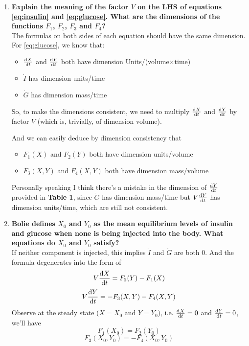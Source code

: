 \begin{homeworkProblem}
\begin{enumerate}
\item \textbf{Explain the meaning of the factor $V$ on the LHS of equations \eqref{eq:insulin} and \eqref{eq:glucose}. What are the dimensions of the functions $F_1$, $F_2$, $F_3$ and $F_4$?}\\

The formulas on both sides of each equation should have the same dimension. For \eqref{eq:glucose}, we know that:\begin{itemize}
    \item $\deriv[t]{X}$ and $\deriv[t]{Y}$ both have dimension Units/(volume$\times$time)
    \item $\dot I$ has dimension units/time
    \item $\dot G$ has dimension mass/time
\end{itemize}
So, to make the dimensions consistent, we need to multiply $\deriv[t]{X}$ and $\deriv[t]{Y}$ by factor $V$ (which is, trivially, of dimension volume).

And we can easily deduce by dimension consistency that \begin{itemize}
    \item $F_1(X)$ and $F_2(Y)$ both have dimension units/volume
    \item $F_3(X, Y)$ and $F_4(X,Y)$ both have dimension mass/volume
\end{itemize}

Personally speaking I think there's a mistake in the dimension of $\deriv[t]{Y}$ provided in \textbf{Table 1}, since $\dot G$ has dimension mass/time but $V\deriv[t]{Y}$ has dimension units/time, which are still not consistent.

\pagebreak

\item \textbf{Bolie defines $X_0$ and $Y_0$ as the mean equilibrium levels of insulin and glucose when none is being injected into the body. What equations do $X_0$ and $Y_0$ satisfy?}\\

If neither component is injected, this implies $\dot{I}$ and $\dot{G}$ are both 0. And the formula degenerates into the form of 
\begin{equation}
    V \deriv[t]{X} = F_2(Y) - F_1(X)
\end{equation}
\begin{equation}
    V \deriv[t]{Y} = - F_3(X, Y)-F_4(X,Y)
\end{equation}
Observe at the steady state ($X = X_0$ and $Y = Y_0$), i.e. $\deriv[t]{X} = 0$ and $\deriv[t]{Y} = 0$, we'll have 
\begin{equation}
    F_1(X_0) = F_2(Y_0)
\end{equation}
\begin{equation}
    F_3(X_0, Y_0) = - F_4(X_0, Y_0)
\end{equation}
\\


\end{enumerate}
\end{homeworkProblem}
